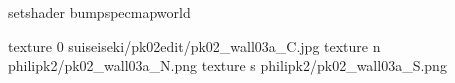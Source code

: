 setshader bumpspecmapworld

texture 0 suiseiseki/pk02edit/pk02_wall03a_C.jpg
texture n philipk2/pk02_wall03a_N.png
texture s philipk2/pk02_wall03a_S.png

